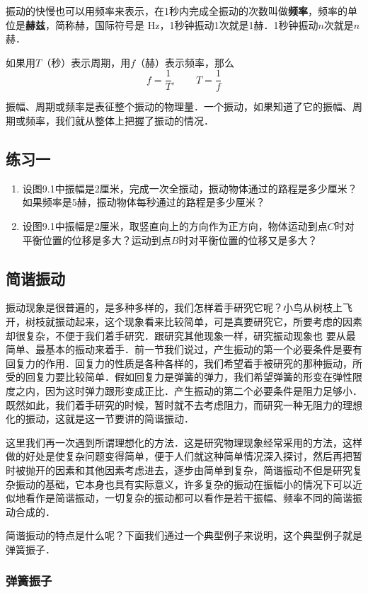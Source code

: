 振动的快慢也可以用频率来表示，在1秒内完成全振动的次数叫做\textbf{频率}，频率的单位是\textbf{赫兹}，简称赫，国际符号是
Hz，1秒钟振动1次就是1赫．1秒钟振动$n$次就是$n$赫．

如果用$T$（秒）表示周期，用$f$（赫）表示频率，那么
\[f=\frac{1}{T},\qquad T=\frac{1}{f}\]

振幅、周期或频率是表征整个振动的物理量．一个振动，如果知道了它的振幅、周期或频率，我们就从整体上把握了振动的情况．

\subsection*{练习一}
\begin{enumerate}
    \item 设图9.1中振幅是2厘米，完成一次全振动，振动物体通过的路程是多少厘米？如果频率是5赫，振动物体每秒通过的路程是多少厘米？
    \item 设图9.1中振幅是2厘米，取竖直向上的方向作为正方向，物体运动到点$C$时对平衡位置的位移是多大？运动到点$B$时对平衡位置的位移又是多大？
\end{enumerate}


\subsection{简谐振动}
振动现象是很普遍的，是多种多样的，我们怎样着手研究它呢？小鸟从树枝上飞开，树枝就振动起来，这个现象看来比较简单，可是真要研究它，所要考虑的因素却很复杂，不便于我们着手研究．跟研究其他现象一样，研究振动现象也
要从最简单、最基本的振动来着手．前一节我们说过，产生振动的第一个必要条件是要有回复力的作用．回复力的性质是各种各样的，我们希望着手被研究的那种振动，所受的回复力要比较简单．假如回复力是弹簧的弹力，我们希望弹簧的形变在弹性限度之内，因为这时弹力跟形变成正比．产生振动的第二个必要条件是阻力足够小．既然如此，我们着手研究的时候，暂时就不去考虑阻力，而研究一种无阻力的理想化的振动，这就是这一节要讲的简谐振动．

这里我们再一次遇到所谓理想化的方法．这是研究物理现象经常采用的方法，这样做的好处是使复杂问题变得简单，便于人们就这种简单情况深入探讨，然后再把暂时被抛开的因素和其他因素考虑进去，逐步由简单到复杂，简谐振动不但是研究复杂振动的基础，它本身也具有实际意义，许多复杂的振动在振幅小的情况下可以近似地看作是简谐振动，一切复杂的振动都可以看作是若干振幅、频率不同的简谐振动合成的．

简谐振动的特点是什么呢？下面我们通过一个典型例子来说明，这个典型例子就是弹簧振子．

\subsubsection{弹簧振子}

